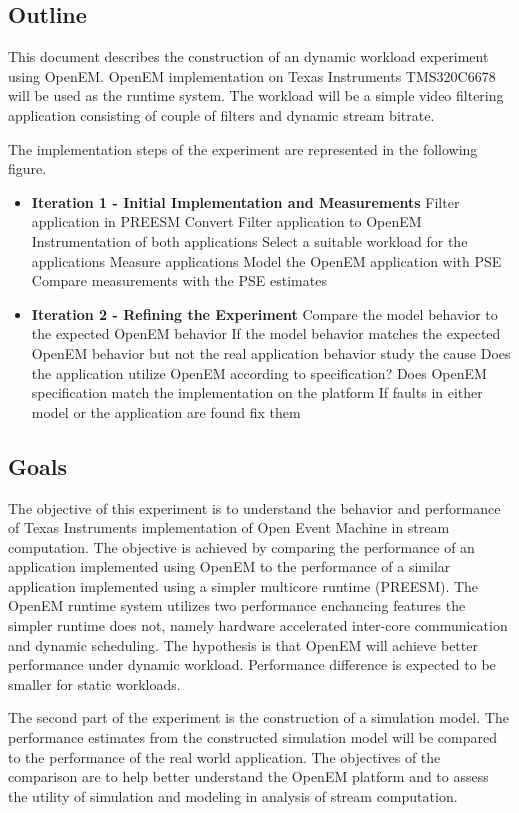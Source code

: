 \subsection{Outline}
This document describes the construction of an dynamic workload experiment using OpenEM. OpenEM implementation on Texas Instruments TMS320C6678 will be used as the runtime system. The workload will be a simple video filtering application consisting of couple of filters and dynamic stream bitrate.

The implementation steps of the experiment are represented in the following figure.

\begin{itemize}
\item[] \textbf{Iteration 1 - Initial Implementation and Measurements}
    \subitem Filter application in PREESM
    \subitem Convert Filter application to OpenEM
    \subitem Instrumentation of both applications
    \subitem Select a suitable workload for the applications
    \subitem Measure applications
    \subitem Model the OpenEM application with PSE
    \subitem Compare measurements with the PSE estimates
\item[] \textbf{Iteration 2 - Refining the Experiment}
    \subitem Compare the model behavior to the expected OpenEM behavior
    \subitem If the model behavior matches the expected OpenEM behavior but not the real application behavior study the cause
    \subitem Does the application utilize OpenEM according to specification?
    \subitem Does OpenEM specification match the implementation on the platform
    \subitem If faults in either model or the application are found fix them
\end{itemize}

\subsection{Goals}
The objective of this experiment is to understand the behavior and performance of Texas Instruments implementation of Open Event Machine in stream computation. The objective is achieved by comparing the performance of an application implemented using OpenEM to the performance of a similar application implemented using a simpler multicore runtime (PREESM). The OpenEM runtime system utilizes two performance enchancing features the simpler runtime does not, namely hardware accelerated inter-core communication and dynamic scheduling. The hypothesis is that OpenEM will achieve better performance under dynamic workload. Performance difference is expected to be smaller for static workloads.

The second part of the experiment is the construction of a simulation model. The performance estimates from the constructed simulation model will be compared to the performance of the real world application. The objectives of the comparison are to help better understand the OpenEM platform and to assess the utility of simulation and modeling in analysis of stream computation.